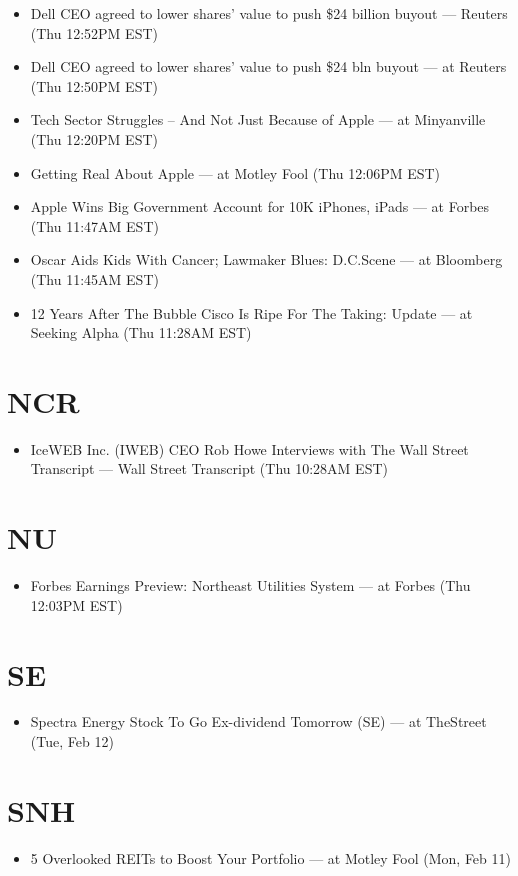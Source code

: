 \documentclass[11pt,asymmetric]{article}
\begin{document}
\begin{itemize}
\item Dell CEO agreed to lower shares' value to push \$24 billion buyout --- Reuters (Thu 12:52PM EST)
\item Dell CEO agreed to lower shares' value to push \$24 bln buyout --- at Reuters (Thu 12:50PM EST)
\item Tech Sector Struggles -- And Not Just Because of Apple --- at Minyanville (Thu 12:20PM EST)
\item Getting Real About Apple --- at Motley Fool (Thu 12:06PM EST)
\item Apple Wins Big Government Account for 10K iPhones, iPads --- at Forbes (Thu 11:47AM EST)
\item Oscar Aids Kids With Cancer; Lawmaker Blues: D.C.Scene --- at Bloomberg (Thu 11:45AM EST)
\item 12 Years After The Bubble Cisco Is Ripe For The Taking: Update --- at Seeking Alpha (Thu 11:28AM EST)
\end{itemize}

\section*{NCR}
\begin{itemize}
\item IceWEB Inc. (IWEB) CEO Rob Howe Interviews with The Wall Street Transcript --- Wall Street Transcript (Thu 10:28AM EST)
\end{itemize}

\section*{NU}
\begin{itemize}
\item Forbes Earnings Preview: Northeast Utilities System --- at Forbes (Thu 12:03PM EST)
\end{itemize}

\section*{SE}
\begin{itemize}
\item Spectra Energy Stock To Go Ex-dividend Tomorrow (SE) --- at TheStreet (Tue, Feb 12)
\end{itemize}

\section*{SNH}
\begin{itemize}
\item 5 Overlooked REITs to Boost Your Portfolio --- at Motley Fool (Mon, Feb 11)
\end{itemize}
\end{document}
